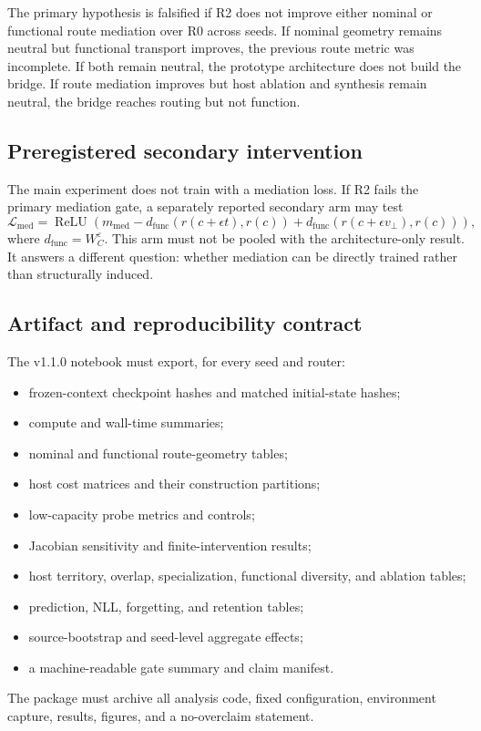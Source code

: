 \documentclass[11pt,a4paper]{article}
\newcommand{\loss}{\mathcal{L}}
\newcommand{\relu}{\operatorname{ReLU}}
\begin{document}
The primary hypothesis is falsified if R2 does not improve either nominal or functional route mediation over R0 across seeds. If nominal geometry remains neutral but functional transport improves, the previous route metric was incomplete. If both remain neutral, the prototype architecture does not build the bridge. If route mediation improves but host ablation and synthesis remain neutral, the bridge reaches routing but not function.

\subsection{Preregistered secondary intervention}

The main experiment does not train with a mediation loss. If R2 fails the primary mediation gate, a separately reported secondary arm may test
\begin{equation}
 \loss_{\mathrm{med}}=
 \relu\left(m_{\mathrm{med}}-
 d_{\mathrm{func}}(r(c+\epsilon t),r(c))+
 d_{\mathrm{func}}(r(c+\epsilon v_\perp),r(c))
 \right),
\end{equation}
where $d_{\mathrm{func}}=W_C^\varepsilon$. This arm must not be pooled with the architecture-only result. It answers a different question: whether mediation can be directly trained rather than structurally induced.

\subsection{Artifact and reproducibility contract}

The v1.1.0 notebook must export, for every seed and router:
\begin{itemize}
\item frozen-context checkpoint hashes and matched initial-state hashes;
\item compute and wall-time summaries;
\item nominal and functional route-geometry tables;
\item host cost matrices and their construction partitions;
\item low-capacity probe metrics and controls;
\item Jacobian sensitivity and finite-intervention results;
\item host territory, overlap, specialization, functional diversity, and ablation tables;
\item prediction, NLL, forgetting, and retention tables;
\item source-bootstrap and seed-level aggregate effects;
\item a machine-readable gate summary and claim manifest.
\end{itemize}
The package must archive all analysis code, fixed configuration, environment capture, results, figures, and a no-overclaim statement.
\end{document}
